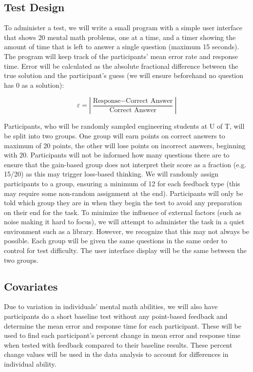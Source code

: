 \documentclass[12pt]{exam}
\begin{document}
\subsection{Test Design}
To administer a test, we will write a small program with a simple user interface that shows 20 mental math problems, one at a time, and a timer showing the amount of time that is left to answer a single question (maximum 15 seconds). The program will keep track of the participants’ mean error rate and response time. Error will be calculated as the absolute fractional difference between the true solution and the participant’s guess (we will ensure beforehand no question has 0 as a solution):

\begin{equation}
    \label{eq:error}
    \varepsilon = \left|\frac{\text{Response}-\text{Correct Answer}}{\text{Correct Answer}}\right|
\end{equation}

Participants, who will be randomly sampled engineering students at U of T, will be split into two groups. One group will earn points on correct answers to maximum of 20 points, the other will lose points on incorrect answers, beginning with 20. Participants will not be informed how many questions there are to ensure that the gain-based group does not interpret their score as a fraction (e.g. 15/20) as this may trigger loss-based thinking. We will randomly assign participants to a group, ensuring a minimum of 12 for each feedback type (this may require some non-random assignment at the end). Participants will only be told which group they are in when they begin the test to avoid any preparation on their end for the task. To minimize the influence of external factors (such as noise making it hard to focus), we will attempt to administer the task in a quiet environment such as a library. However, we recognize that this may not always be possible. Each group will be given the same questions in the same order to control for test difficulty. The user interface display will be the same between the two groups.

\subsection{Covariates}
Due to variation in individuals’ mental math abilities, we will also have participants do a short baseline test without any point-based feedback and determine the mean error and response time for each participant. These will be used to find each participant's percent change in mean error and response time when tested with feedback compared to their baseline results. These percent change values will be used in the data analysis to account for differences in individual ability. 
\end{document}
